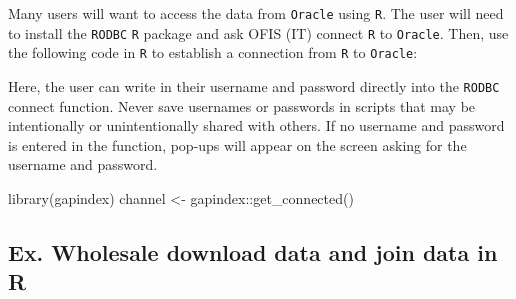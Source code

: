 \documentclass[
  letterpaper,
  oneside,
  open=any]{scrbook}
\newenvironment{Shaded}{\begin{snugshade}}{\end{snugshade}}
\newcommand{\FunctionTok}[1]{\textcolor[rgb]{0.28,0.35,0.67}{#1}}
\newcommand{\NormalTok}[1]{\textcolor[rgb]{0.00,0.23,0.31}{#1}}
\newcommand{\OtherTok}[1]{\textcolor[rgb]{0.00,0.23,0.31}{#1}}
\newcommand{\SpecialCharTok}[1]{\textcolor[rgb]{0.37,0.37,0.37}{#1}}
\begin{document}
Many users will want to access the data from \texttt{Oracle} using
\texttt{R}. The user will need to install the \texttt{RODBC} \texttt{R}
package and ask OFIS (IT) connect \texttt{R} to \texttt{Oracle}. Then,
use the following code in \texttt{R} to establish a connection from
\texttt{R} to \texttt{Oracle}:

Here, the user can write in their username and password directly into
the \texttt{RODBC} connect function. Never save usernames or passwords
in scripts that may be intentionally or unintentionally shared with
others. If no username and password is entered in the function, pop-ups
will appear on the screen asking for the username and password.

\begin{Shaded}
\begin{Highlighting}[]
\FunctionTok{library}\NormalTok{(gapindex)}
\NormalTok{channel }\OtherTok{\textless{}{-}}\NormalTok{ gapindex}\SpecialCharTok{::}\FunctionTok{get\_connected}\NormalTok{()}
\end{Highlighting}
\end{Shaded}

\hypertarget{ex.-wholesale-download-data-and-join-data-in-r}{%
\subsection{Ex. Wholesale download data and join data in
R}\label{ex.-wholesale-download-data-and-join-data-in-r}}
\end{document}
